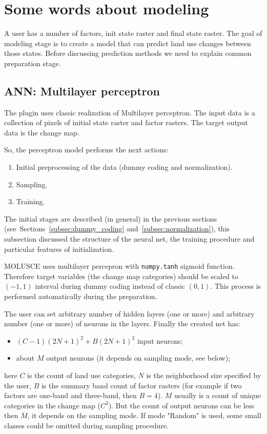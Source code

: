 \documentclass{report}
\begin{document}
\section{Some words about modeling}\label{sec:modeling}

A user has a number of factors, init state raster and final state raster.
The goal of modeling stage is to create a model that can predict land use changes between those states. Before discussing prediction methods we need to explain common preparation stage.

\subsection{ANN: Multilayer perceptron}\label{subsec:ANN}

The plugin uses classic realization of Multilayer perceptron. The input data is a collection of pixels of initial state raster and factor rasters. The target output data is the change map.

So, the perceptron model performs the next actions:
\begin{enumerate}
    \item Initial preprocessing of the data (dummy coding and normalization).
    \item Sampling.
    \item Training.
\end{enumerate}

The initial stages are described (in general) in the previous sections (see~Sections~\ref{subsec:dummy_coding} and~\ref{subsec:normalization}), this subsection discussed the structure of the neural net, the training procedure and particular features of initialization. 

MOLUSCE uses multilayer percepron with \verb+numpy.tanh+ sigmoid function. Therefore target variables (the change map categories) should be scaled to $(-1, 1)$ interval during dummy coding instead of classic $(0, 1)$. This process is performed automatically during the preparation.

The user can set arbitrary number of hidden layers (one or more) and arbitrary number (one or more) of neurons in the layers.
Finally the created net has:
\begin{itemize}
  \item $(C-1)(2N+1)^{2}+B(2N+1)^{2}$ input neurons;
  \item about $M$ output neurons (it depends on sampling mode, see below);
\end{itemize}
here $C$ is the count of land use categories, $N$ is the neighborhood size specified by the user, $B$ is the summary band count of factor rasters (for example if two factors are one-band and three-band, then $B=4$). $M$ usually is a count of unique categories in the change map ($C^{2}$). But the count of output neurons can be less then $M$, it depends on the sampling mode. If mode "Random" is used, some small classes could be omitted during sampling procedure. 
\end{document}
